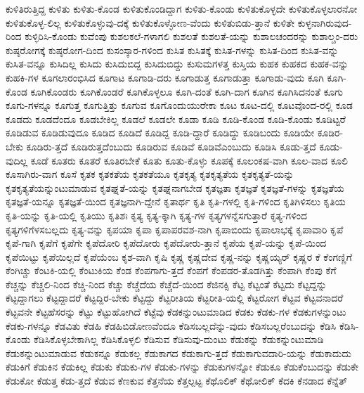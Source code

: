 {ಕುಳಿತಿರುತ್ತಿದ್ದ
ಕುಳಿತು
ಕುಳಿತು-ಕೊಂಡ
ಕುಳಿತುಕೊಂಡಿದ್ದಾಗ
ಕುಳಿತು-ಕೊಂಡು
ಕುಳಿತುಕೊಳ್ಳದೇ
ಕುಳಿತುಕೊಳ್ಳಲಾರನೋ
ಕುಳಿತುಕೊಳ್ಳ-ಲಿಲ್ಲ
ಕುಳಿತುಕೊಳ್ಳುವು-ದಕ್ಕೆ
ಕುಳಿತುಕೊಳ್ಳೋಣ-ವೆಂದು
ಕುಳಿತುಬಿಡು-ತ್ತಾನೆ
ಕುಳಿತೇ
ಕುಳ್ಳನಾಗಿರುವುದ-ರಿಂದ
ಕುಳ್ಳಿರಿಸಿ-ಕೊಂಡು
ಕುವೆಂಪು
ಕುಶಲಕಲೆ-ಗಳಾಗಲಿ
ಕುಶಲತೆ
ಕುಶಲತೆ-ಯನ್ನು
ಕುಶಾಲಚಂದರನ್ನು
ಕುಶಾಲ್ಚಂ-ದರು
ಕುಷ್ಠರೋಗಕ್ಕೆ
ಕುಷ್ಠರೋಗ-ದಿಂದ
ಕುಸಂಸ್ಕಾರ-ಗಳಿಂದ
ಕುಸಿತ
ಕುಸಿತಕ್ಕೆ
ಕುಸಿತ-ಗಳನ್ನು
ಕುಸಿತ-ದಿಂದ
ಕುಸಿತ-ವನ್ನು
ಕುಸಿತ-ವನ್ನೂ
ಕುಸಿದಿಲ್ಲ
ಕುಸಿದು
ಕುಸಿದುಬಿದ್ದ
ಕುಸಿದುಬಿದ್ದು
ಕುಸುಮಗಳತ್ತ
ಕುಸ್ತಿಯ
ಕುಹಕ
ಕುಹಕದ
ಕುಹಕ-ವನ್ನು
ಕುಹಕಿ-ಗಳ
ಕೂಗಲಾರಂಭಿಸಿದ
ಕೂಗಾಟ
ಕೂಗಾಡಿ-ದರು
ಕೂಗಾಡುತ್ತ
ಕೂಗಾಡುತ್ತಾ
ಕೂಗಾಡು-ವುದು
ಕೂಗಿ
ಕೂಗಿ-ಕೊಂಡ
ಕೂಗಿಕೊಂಡರು
ಕೂಗಿಕೊಂಡರೆ
ಕೂಗಿಕೊಳ್ಳಲೂ
ಕೂಗಿ-ದಂತೆ
ಕೂಗಿ-ದಾಗ
ಕೂಗಿನ
ಕೂಗಿಸಿದನಂತೆ
ಕೂಗು
ಕೂಗು-ಗಳನ್ನೂ
ಕೂಗುತ್ತ
ಕೂಗುತ್ತಿತ್ತು
ಕೂಗುವ
ಕೂಗೊಂದುಯುರೇಕಾ
ಕೂಟ
ಕೂಟ-ದಲ್ಲಿ
ಕೂಟವೊಂದ-ರಲ್ಲಿ
ಕೂಡ
ಕೂಡದು
ಕೂಡದೆಂದೂ
ಕೂಡಬೇಕಿಲ್ಲ
ಕೂಡಲೆ
ಕೂಡಲೇ
ಕೂಡಾ
ಕೂಡಿ
ಕೂಡಿ-ಕೊಂಡ
ಕೂಡಿ-ಕೊಂಡು
ಕೂಡಿಟ್ಟರೆ
ಕೂಡಿಡುವ
ಕೂಡಿಡುವುದೂ
ಕೂಡಿದ
ಕೂಡಿದೆ
ಕೂಡಿದ್ದ
ಕೂಡಿ-ದ್ದಾರೆ
ಕೂಡಿದ್ದು
ಕೂಡಿಬಂದು
ಕೂಡಿಯೇ
ಕೂಡಿರ-ಬೇಕು
ಕೂಡಿರು-ತ್ತದೆ
ಕೂಡಿರುತ್ತದೆಂಬುದು
ಕೂಡಿರುವ
ಕೂಡಿವೆ
ಕೂಡಿವೆಎಂಬುದು
ಕೂಡಿಸಿ
ಕೂಡು-ತ್ತದೆ
ಕೂಡು-ವುದಿಲ್ಲ
ಕೂಡೆ
ಕೂತರು
ಕೂತರೆ
ಕೂತಿರಬೇಕೆ
ಕೂತು
ಕೂತು-ಕೊಳ್ಳು
ಕೂಪಕ್ಕೆ
ಕೂಲಂಕಷ-ವಾಗಿ
ಕೂಲ-ವಾದ
ಕೂಲಿ
ಕೂಸಾಗಿರು-ವಾಗ
ಕೂಸೆ
ಕೃತಕ
ಕೃತಕತೆಯ
ಕೃತಕತೆಯೂ
ಕೃತಕೃತ್ಯ
ಕೃತಕೃತ್ಯತೆಯ
ಕೃತಕೃತ್ಯತೆ-ಯನ್ನು
ಕೃತಕೃತ್ಯತೆಯನ್ನುಂಟುಮಾಡುವ
ಕೃತಘ್ನತೆ-ಯನ್ನು
ಕೃತಘ್ನನಾಗಬೇಡ
ಕೃತಜ್ಞತಾ
ಕೃತಜ್ಞತೆ
ಕೃತಜ್ಞತೆ-ಗಳನ್ನು
ಕೃತಜ್ಞತೆಯ
ಕೃತಜ್ಞತೆ-ಯನ್ನೂ
ಕೃತಜ್ಞತೆ-ಯಿಂದ
ಕೃತಜ್ಞನಾಗಿ-ದ್ದೇನೆ
ಕೃತಾರ್ಥ
ಕೃತಿ
ಕೃತಿ-ಗಳಲ್ಲಿ
ಕೃತಿ-ಗಳಿಂದ
ಕೃತಿಗಿಳಿಸಲು
ಕೃತಿಯ
ಕೃತಿ-ಯನ್ನು
ಕೃತಿ-ಯಲ್ಲಿ
ಕೃತಿಯು
ಕೃತಿಶಃ
ಕೃತ್ಯ
ಕೃತ್ಯ-ಕ್ಕಾಗಿ
ಕೃತ್ಯ-ಗಳ
ಕೃತ್ಯಗಳನ್ನೆಸಗುತ್ತಾರೆ
ಕೃತ್ಯ-ಗಳಿಂದ
ಕೃತ್ಯಗಳಿಗೆಳಸಬಲ್ಲದು
ಕೃತ್ಯ-ವನ್ನು
ಕೃಪಯಾ
ಕೃಪಾ
ಕೃಪಾಪರವಶ-ನಾಗಿ
ಕೃಪಾಬಿಂದು
ಕೃಪಾಲಾಭಕ್ಕೆ
ಕೃಪಾವಾರಿ
ಕೃಪೆ
ಕೃಪೆ-ಗಾಗಿ
ಕೃಪೆಗೆ
ಕೃಪೆಗೇ
ಕೃಪೆದೋರಿ
ಕೃಪೆದೋರು
ಕೃಪೆದೋರು-ತ್ತಾನೆ
ಕೃಪೆಯ
ಕೃಪೆ-ಯನ್ನು
ಕೃಪೆ-ಯಿಂದ
ಕೃಪೆಯಿಟ್ಟು
ಕೃಪೆಯಿಲ್ಲದೆ
ಕೃಪೆಯೆಂಬ
ಕೃಶ-ವಾಗಿ
ಕೃಷಿ
ಕೃಷ್ಣ
ಕೃಷ್ಣದೇವ
ಕೃಷ್ಣ-ನನ್ನು
ಕೃಷ್ಣಯ್ಯರ್
ಕೃಷ್ಣರ
ಕೆ
ಕೆಂಗಣ್ಣಿಗೆ
ಕೆಂಗಿಚ್ಚು
ಕೆಂಟಕಿ-ಯಲ್ಲಿ
ಕೆಂಟುಕಿಯ
ಕೆಂಡ
ಕೆಂಪಗಾಗು-ತ್ತದೆ
ಕೆಂಪಗೆ
ಕೆಂಪಡರ-ತೊಡಗಿತ್ತು
ಕೆಂಪಾಗಿ
ಕೆಂಪು
ಕೆಗೆ
ಕೆಚ್ಚನ್ನು
ಕೆಚ್ಚಲಿ-ನಿಂದ
ಕೆಚ್ಚಿ-ನಿಂದ
ಕೆಚ್ಚು
ಕೆಚ್ಚೆದೆಯ
ಕೆಚ್ಚೆದೆ-ಯಿಂದ
ಕೆಜಿನಕ್ಸಿ
ಕೆಟ್ಟ
ಕೆಟ್ಟಂತೆ
ಕೆಟ್ಟದು
ಕೆಟ್ಟದ್ದನ್ನು
ಕೆಟ್ಟದ್ದಾಗಲು
ಕೆಟ್ಟದ್ದಾದರೆ
ಕೆಟ್ಟದ್ದಿರ-ಬೇಕು
ಕೆಟ್ಟದ್ದು
ಕೆಟ್ಟರೀತಿಯ
ಕೆಟ್ಟರೀತಿ-ಯಲ್ಲಿ
ಕೆಟ್ಟರೋಗ
ಕೆಟ್ಟವ
ಕೆಟ್ಟವನಾದರೆ
ಕೆಟ್ಟವನೇ
ಕೆಟ್ಟಹೆಸರನ್ನು
ಕೆಟ್ಟು
ಕೆಟ್ಟುಹೋಗಿದೆ
ಕೆಟ್ಟೆವು
ಕೆಡಕನ್ನುಂಟುಮಾಡಿದ
ಕೆಡಕು
ಕೆಡಕು-ಗಳ
ಕೆಡಕುಗಳನ್ನುಂಟು
ಕೆಡಕು-ಗಳನ್ನೂ
ಕೆಡವಿತು
ಕೆಡಹಿ
ಕೆಡಹಿಬಿಡೋಣವೆಂದೂ
ಕೆಡಿಸಬಲ್ಲದೆನ್ನು-ವುದು
ಕೆಡಿಸಬಲ್ಲರೆಂಬುದನ್ನು
ಕೆಡಿಸಿ
ಕೆಡಿಸಿ-ಕೊಂಡು
ಕೆಡಿಸಿಕೊಳ್ಳಬೇಕಾಗಿಲ್ಲ
ಕೆಡಿಸಿಕೊಳ್ಳಲಿ
ಕೆಡಿಸುವ
ಕೆಡಿಸುವು-ದುಂಟು
ಕೆಡುಕನ್ನು
ಕೆಡುಕನ್ನುಂಟುಮಾಡಿ
ಕೆಡುಕನ್ನುಂಟುಮಾಡುವ
ಕೆಡುಕನ್ನೂ
ಕೆಡುಕಲ್ಲ
ಕೆಡುಕಾಗದ
ಕೆಡುಕಾಗು-ತ್ತದೆ
ಕೆಡುಕಾಗುವದಾರಿ-ಯನ್ನು
ಕೆಡುಕಾದುದು
ಕೆಡುಕಿಗೆ
ಕೆಡುಕಿನ
ಕೆಡುಕಿಲ್ಲ
ಕೆಡುಕು
ಕೆಡುಕು-ಗಳ
ಕೆಡುಕು-ಗಳನ್ನು
ಕೆಡುಕುಗಳನ್ನೋ
ಕೆಡುಕೂ
ಕೆಡುಕೆಂಬುದನ್ನು
ಕೆಡುಕೇ
ಕೆಡುಕೋ
ಕೆಡುತ್ತ
ಕೆಡು-ತ್ತದೆ
ಕೆಡುವ
ಕೆಣಕುವ
ಕೆತ್ತನೆಯ
ಕೆತ್ತಲ್ಪಟ್ಟ
ಕೆಥೊಲಿಕ್
ಕೆಥೋಲಿಕ್
ಕೆದಕಿ
ಕೆನಡಾದ
ಕೆನ್ನೆತ್
}
